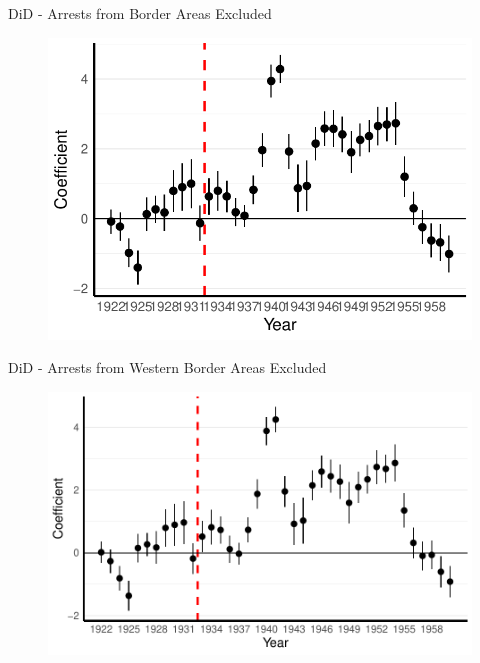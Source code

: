 \documentclass[11pt]{beamer}
\begin{document}
\begin{frame}[label=did_non_border_area]{DiD - Arrests from Border Areas Excluded}
 \begin{figure}[h]
\centering
\includegraphics[width=1\textwidth]{point_range_robust_cr2_non_border_provinces.pdf}
\end{figure}
\hyperlink{robustness_checks}{}
\end{frame}


\begin{frame}[label=did_non_border_area_west]{DiD - Arrests from Western Border Areas Excluded}
 \begin{figure}[h]
\centering
\includegraphics[width=1\textwidth]{point_range_robust_cr2_non_border_provinces_western.pdf}
\end{figure}
\hyperlink{add_content}{}
\end{frame}
\end{document}
